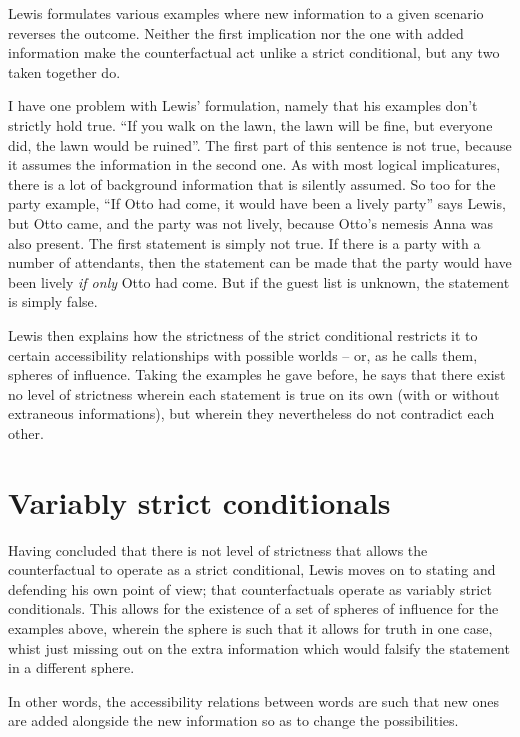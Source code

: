 \documentclass[12pt]{article}
\begin{document}
Lewis formulates various examples where new information to a given scenario
reverses the outcome. Neither the first implication nor the one with added
information make the counterfactual act unlike a strict conditional, but any two
taken together do.

I have one problem with Lewis' formulation, namely that his examples don't
strictly hold true. ``If you walk on the lawn, the lawn will be fine, but
everyone did, the lawn would be ruined''. The first part of this sentence is not
true, because it assumes the information in the second one. As with most logical
implicatures, there is a lot of background information that is silently assumed.
So too for the party example, ``If Otto had come, it would have been a lively
party'' says Lewis, but Otto came, and the party was not lively, because Otto's
nemesis Anna was also present. The first statement is simply not true. If there
is a party with a number of attendants, then the statement can be made that the
party would have been lively \emph{if only} Otto had come. But if the guest list
is unknown, the statement is simply false.

Lewis then explains how the strictness of the strict conditional restricts it to
certain accessibility relationships with possible worlds -- or, as he calls
them, spheres of influence. Taking the examples he gave before, he says that
there exist no level of strictness wherein each statement is true on its own
(with or without extraneous informations), but wherein they nevertheless do not
contradict each other.

\section{Variably strict conditionals}

Having concluded that there is not level of strictness that allows the
counterfactual to operate as a strict conditional, Lewis moves on to stating and
defending his own point of view; that counterfactuals operate as variably strict
conditionals. This allows for the existence of a set of spheres of influence for
the examples above, wherein the sphere is such that it allows for truth in one
case, whist just missing out on the extra information which would falsify the
statement in a different sphere.

In other words, the accessibility relations between words are such that new ones
are added alongside the new information so as to change the possibilities.
\end{document}
